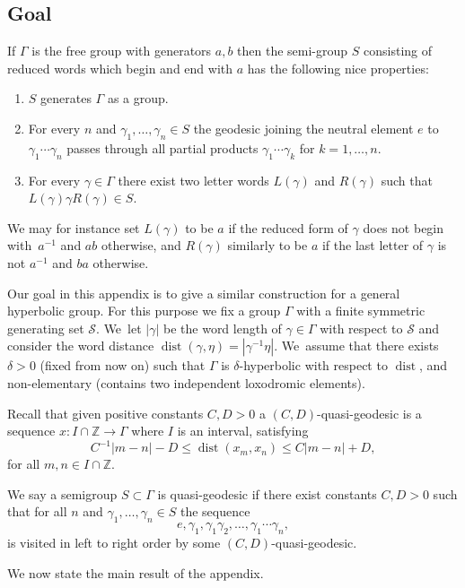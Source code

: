 \documentclass[JEP,XML,SOM,Unicode,NoEqCountersInSection,published]{cedram}
\newcommand{\Z}{\mathbb{Z}}
\newcommand{\cS}{\mathcal{S}}
\DeclareMathOperator{\dist}{dist}
\begin{document}
\subsection{Goal}

If \(\Gamma\) is the free group with generators \(a,b\) then the semi-group \(S\) consisting of reduced words which begin and end with \(a\) has the following nice properties:
\begin{enumerate}
\item \(S\) generates \(\Gamma\) as a group.
\item For every \(n\) and \(\gamma_1,\ldots, \gamma_n \in S\) the geodesic joining the neutral element \(e\) to \(\gamma_1\cdots \gamma_n\) passes through all partial products \(\gamma_1\cdots \gamma_k\) for \(k = 1,\ldots, n\).
\item For every \(\gamma \in \Gamma\) there exist two letter words \(L(\gamma)\) and \(R(\gamma)\) such that \(L(\gamma)\gamma R(\gamma) \in S\).
\end{enumerate}
We may for instance set \(L(\gamma)\) to be \(a\) if the reduced form of \(\gamma\) does not begin with~\(a^{-1}\) and \(ab\) otherwise, and \(R(\gamma)\) similarly to be \(a\) if the last letter of \(\gamma\) is not \(a^{-1}\) and \(ba\) otherwise.

Our goal in this appendix is to give a similar construction for a general hyperbolic group.
For this purpose we fix a group \(\Gamma\) with a finite symmetric generating set \(\cS\). We~let \(|\gamma|\) be the word length of \(\gamma \in \Gamma\) with respect to \(\cS\) and consider the word distance \(\dist(\gamma,\eta) = |\gamma^{-1}\eta|\). We~assume that there exists \(\delta > 0\) (fixed from now on) such that \(\Gamma\) is \(\delta\)-hyperbolic with respect to \(\dist\), and non-elementary (\ie contains two independent loxodromic elements).

Recall that given positive constants \(C,D > 0\) a \((C,D)\)-quasi-geodesic is a sequence \(x: I \cap \Z \to \Gamma\) where \(I\) is an interval, satisfying
\[
C^{-1}|m-n| - D \le \dist(x_m,x_n) \le C|m-n| + D,
\]
for all \(m,n \in I \cap \Z\).

We say a semigroup \(S \subset \Gamma\) is quasi-geodesic if there exist constants \(C,D > 0\) such that for all \(n\) and \(\gamma_1,\ldots, \gamma_n \in S\) the sequence
\[
e, \gamma_1,\gamma_1\gamma_2,\ldots, \gamma_1\cdots \gamma_n,
\]
is visited in left to right order by some \((C,D)\)-quasi-geodesic.

We now state the main result of the appendix.
\end{document}
